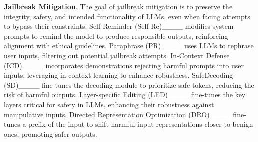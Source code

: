 \noindent\textbf{Jailbreak Mitigation}. 
The goal of jailbreak mitigation is to preserve the integrity, safety, and intended functionality of LLMs, even when facing attempts to bypass their constraints. Self-Reminder (Self-Re)____ modifies system prompts to remind the model to produce responsible outputs, reinforcing alignment with ethical guidelines. Paraphrase (PR)____ uses LLMs to rephrase user inputs, filtering out potential jailbreak attempts. In-Context Defense (ICD)____ incorporates demonstrations rejecting harmful prompts into user inputs, leveraging in-context learning to enhance robustness. SafeDecoding (SD)____ fine-tunes the decoding module to prioritize safe tokens, reducing the risk of harmful outputs. Layer-specific Editing (LED)____ fine-tunes the key layers critical for safety in LLMs, enhancing their robustness against manipulative inputs. Directed Representation Optimization (DRO)____ fine-tunes a prefix of the input to shift harmful input representations closer to benign ones, promoting safer outputs.